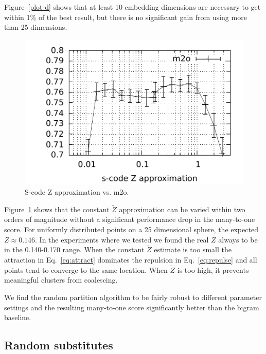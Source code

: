 \documentclass[11pt]{article}
\begin{document}
Figure~\ref{plot-d} shows that at least 10 embedding dimensions are
necessary to get within 1\% of the best result, but there is no
significant gain from using more than 25 dimensions.

\begin{figure}[ht] \centering
\includegraphics[width=\linewidth]{plot-z.pdf}
\caption{S-code Z approximation vs. m2o.}
\label{plot-z}
\end{figure}

Figure~\ref{plot-z} shows that the constant $\tilde{Z}$ approximation
can be varied within two orders of magnitude without a significant
performance drop in the many-to-one score.  For uniformly distributed
points on a 25 dimensional sphere, the expected $Z\approx 0.146$.  In
the experiments where we tested we found the real $Z$ always to be in
the 0.140-0.170 range.  When the constant $\tilde{Z}$ estimate is too
small the attraction in Eq.~\ref{eq:attract} dominates the repulsion
in Eq.~\ref{eq:repulse} and all points tend to converge to the same
location.  When $\tilde{Z}$ is too high, it prevents meaningful
clusters from coalescing.

We find the random partition algorithm to be fairly robust to different
parameter settings and the resulting many-to-one score significantly
better than the bigram baseline.

\subsection{Random substitutes}\label{sec:wordsub}
\end{document}
